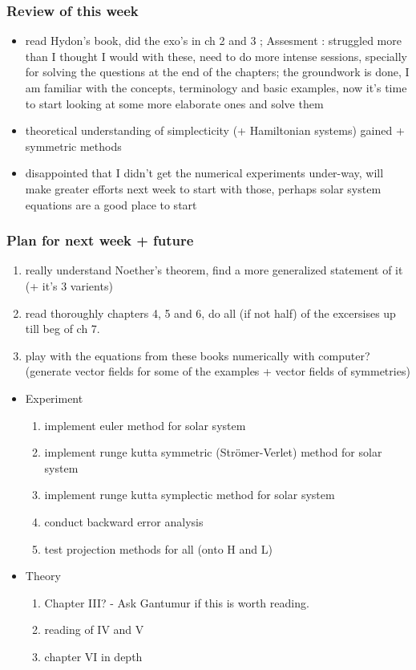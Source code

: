 \documentclass[12pt]{article}
\begin{document}
\subsubsection{Review of this week}
\begin{itemize}
    \item read Hydon's book, did the exo's in ch 2 and 3 ; Assesment :  struggled more than I thought I would with these, need to do more intense sessions, specially for solving the questions at the end of the chapters; the groundwork is done, I am familiar with the concepts, terminology and basic examples, now it's time to start looking at some more elaborate ones and solve them
    \item theoretical understanding of simplecticity (+ Hamiltonian systems) gained + symmetric methods
    \item disappointed that I didn't get the numerical experiments under-way, will make greater efforts next week to start with those, perhaps solar system equations are a good place to start
\end{itemize}

\subsubsection{Plan for next week + future}
\begin{enumerate}
    \item really understand Noether's theorem, find a more generalized statement of it (+ it's 3 varients)
    \item read thoroughly chapters 4, 5 and 6, do all (if not half) of the excersises up till beg of ch 7. 
    \item play with the equations from these books numerically with computer? (generate vector fields for some of the examples + vector fields of symmetries)
\end{enumerate}
\begin{itemize}
    \item Experiment
    \begin{enumerate}
        \item implement euler method for solar system
        \item implement runge kutta symmetric (Str\"omer-Verlet) method for solar system
        \item implement runge kutta symplectic method for solar system
        \item conduct backward error analysis
        \item test projection methods for all (onto H and L)
    \end{enumerate}
    \item Theory
    \begin{enumerate}
        \item Chapter III? - Ask Gantumur if this is worth reading. 
        \item reading of IV and V
        \item chapter VI in depth
    \end{enumerate}
\end{itemize}
\end{document}
